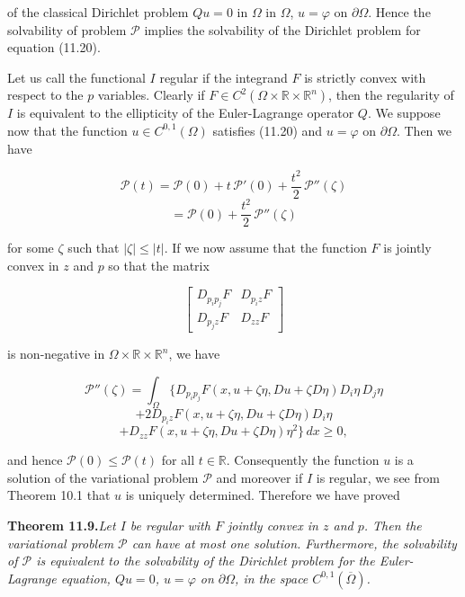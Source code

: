 
\pagestyle{empty}


of the classical Dirichlet problem $Qu=0$ in $\Omega$ in $\Omega$, $u=\varphi$ on $\partial\Omega$. Hence the solvability of problem $\mathcal{P}$ implies the solvability of the Dirichlet problem for equation (11.20).

\medskip

Let us call the functional $I$ regular if the integrand $F$ is strictly convex with respect to the $p$ variables. Clearly if $F\in C^2(\Omega\times\mathbb{R}\times\mathbb{R}^n)$, then the regularity of $I$ is equivalent to the ellipticity of the Euler-Lagrange operator $Q$. We suppose now that the function $u\in C^{0,1}(\Omega)$ satisfies (11.20) and $u=\varphi$ on $\partial\Omega$. Then we have

\[
\mathcal{P}(t)=\mathcal{P}(0)+t\,\mathcal{P}'(0)+\frac{t^2}{2}\,\mathcal{P}''(\zeta)
\]
\[
=\mathcal{P}(0)+\frac{t^2}{2}\,\mathcal{P}''(\zeta)
\]

for some $\zeta$ such that $|\zeta|\leq |t|$. If we now assume that the function $F$ is jointly convex in $z$ and $p$ so that the matrix

\[
\begin{bmatrix}
D_{p_i p_j}F & D_{p_i z}F \\
D_{p_j z}F & D_{zz}F
\end{bmatrix}
\]

is non-negative in $\Omega\times\mathbb{R}\times\mathbb{R}^n$, we have

\[
\mathcal{P}''(\zeta)=\int_{\Omega}\{D_{p_i p_j}F(x,u+\zeta\eta,Du+\zeta D\eta)D_i\eta\,D_j\eta
\]
\[
+2D_{p_i z}F(x,u+\zeta\eta,Du+\zeta D\eta)D_i\eta
\]
\[
+D_{zz}F(x,u+\zeta\eta,Du+\zeta D\eta)\eta^2\}\,dx\geq 0,
\]

and hence $\mathcal{P}(0)\leq \mathcal{P}(t)$ for all $t\in\mathbb{R}$. Consequently the function $u$ is a solution of the variational problem $\mathcal{P}$ and moreover if $I$ is regular, we see from Theorem 10.1 that $u$ is uniquely determined. Therefore we have proved

\medskip

\noindent\textbf{Theorem 11.9.}\quad \textit{Let $I$ be regular with $F$ jointly convex in $z$ and $p$. Then the variational problem $\mathcal{P}$ can have at most one solution. Furthermore, the solvability of $\mathcal{P}$ is equivalent to the solvability of the Dirichlet problem for the Euler-Lagrange equation, $Qu=0$, $u=\varphi$ on $\partial\Omega$, in the space $C^{0,1}(\overline{\Omega})$.}

